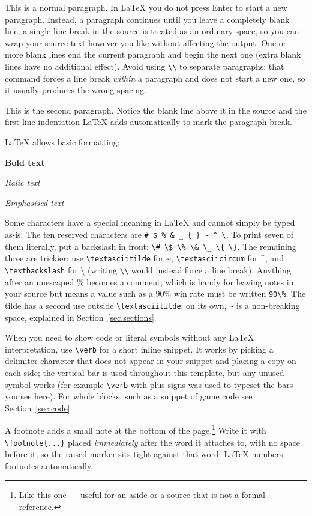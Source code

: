 \documentclass[a4paper,twoside,twocolumn]{IEEEtran}
\begin{document}
This is a normal paragraph. In LaTeX you do not press Enter to start a new
paragraph. Instead, a paragraph continues until you leave a completely blank
line; a single line break in the source is treated as an ordinary space, so you
can wrap your source text however you like without affecting the output. One or
more blank lines end the current paragraph and begin the next one (extra blank
lines have no additional effect). Avoid using \verb|\\| to separate paragraphs:
that command forces a line break \emph{within} a paragraph and does not start a
new one, so it usually produces the wrong spacing.

This is the second paragraph. Notice the blank line above it in the source and
the first-line indentation LaTeX adds automatically to mark the paragraph break.

LaTeX allows basic formatting:

\textbf{Bold text}

\textit{Italic text}

\emph{Emphasised text}

Some characters have a special meaning in LaTeX and cannot simply be typed as-is.
The ten reserved characters are
\verb|# $ % & _ { } ~ ^ \|. To print seven of them literally, put a backslash
in front: \verb|\# \$ \% \& \_ \{ \}|. The remaining three are trickier: use
\verb|\textasciitilde| for \textasciitilde, \verb|\textasciicircum| for
\textasciicircum, and \verb|\textbackslash| for \textbackslash{} (writing
\verb|\\| would instead force a line break). Anything after an unescaped \%
becomes a comment, which is handy for leaving notes in your source but means a
value such as a 90\% win rate must be written \verb|90\%|. The tilde has a second
use outside \verb|\textasciitilde|: on its own, \verb|~| is a non-breaking space,
explained in Section~\ref{sec:sections}.

When you need to show code or literal symbols without any LaTeX interpretation,
use \verb|\verb| for a short inline snippet. It works by picking a delimiter
character that does not appear in your snippet and placing a copy on each side;
the vertical bar is used throughout this template, but any unused symbol works
(for example \verb+\verb+ with plus signs was used to typeset the bars you see
here). For whole blocks, such as a snippet of game code see Section~\ref{sec:code}.

A footnote adds a small note at the bottom of the page.\footnote{Like this one
--- useful for an aside or a source that is not a formal reference.} Write it
with \verb|\footnote{...}| placed \emph{immediately} after the word it attaches
to, with no space before it, so the raised marker sits tight against that word.
LaTeX numbers footnotes automatically.
\end{document}
